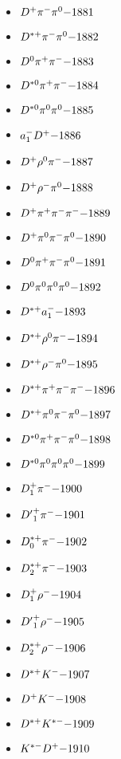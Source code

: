 \begin{multicols}{3}
\begin{itemize}
 \item $ D^{+} \pi^{-} \pi^{0} \hfill{-1881}$
 \item $ D^{*+} \pi^{-} \pi^{0} \hfill{-1882}$
 \item $ D^{0} \pi^{+} \pi^{-} \hfill{-1883}$
 \item $ D^{*0} \pi^{+} \pi^{-} \hfill{-1884}$
 \item $ D^{*0} \pi^{0} \pi^{0} \hfill{-1885}$
 \item $ a_{1}^{-} D^{+} \hfill{-1886}$
 \item $ D^{+} \rho^{0} \pi^{-} \hfill{-1887}$
 \item $ D^{+} \rho^{-} \pi^{0} \hfill{-1888}$
 \item $ D^{+} \pi^{+} \pi^{-} \pi^{-} \hfill{-1889}$
 \item $ D^{+} \pi^{0} \pi^{-} \pi^{0} \hfill{-1890}$
 \item $ D^{0} \pi^{+} \pi^{-} \pi^{0} \hfill{-1891}$
 \item $ D^{0} \pi^{0} \pi^{0} \pi^{0} \hfill{-1892}$
 \item $ D^{*+} a_{1}^{-} \hfill{-1893}$
 \item $ D^{*+} \rho^{0} \pi^{-} \hfill{-1894}$
 \item $ D^{*+} \rho^{-} \pi^{0} \hfill{-1895}$
 \item $ D^{*+} \pi^{+} \pi^{-} \pi^{-} \hfill{-1896}$
 \item $ D^{*+} \pi^{0} \pi^{-} \pi^{0} \hfill{-1897}$
 \item $ D^{*0} \pi^{+} \pi^{-} \pi^{0} \hfill{-1898}$
 \item $ D^{*0} \pi^{0} \pi^{0} \pi^{0} \hfill{-1899}$
 \item $ D_{1}^{+} \pi^{-} \hfill{-1900}$
 \item $ {D^{\prime}}_{1}^{+} \pi^{-} \hfill{-1901}$
 \item $ D_{0}^{*+} \pi^{-} \hfill{-1902}$
 \item $ D_{2}^{*+} \pi^{-} \hfill{-1903}$
 \item $ D_{1}^{+} \rho^{-} \hfill{-1904}$
 \item $ {D^{\prime}}_{1}^{+} \rho^{-} \hfill{-1905}$
 \item $ D_{2}^{*+} \rho^{-} \hfill{-1906}$
 \item $ D^{*+} K^{-} \hfill{-1907}$
 \item $ D^{+} K^{-} \hfill{-1908}$
 \item $ D^{*+} K^{*-} \hfill{-1909}$
 \item $ K^{*-} D^{+} \hfill{-1910}$

\end{itemize}
\end{multicols}
